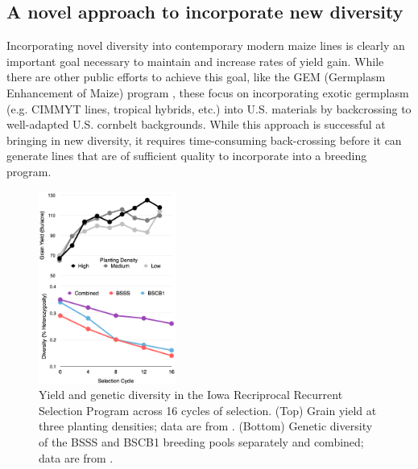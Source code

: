 \documentclass[final,12pt]{article}
\begin{document}
\subsection*{A novel approach to incorporate new diversity}

Incorporating novel diversity into contemporary modern maize lines is clearly an important goal necessary to maintain and increase rates of yield gain.
While there are other public efforts to achieve this goal, like the GEM  (Germplasm Enhancement of Maize) program \citep{pollak2003history}, these  focus on incorporating exotic germplasm (e.g. CIMMYT lines, tropical hybrids, etc.) into U.S. materials by backcrossing to well-adapted U.S. cornbelt backgrounds.
While this approach is successful at bringing in new diversity, it requires time-consuming back-crossing before it can generate lines that are of sufficient quality to incorporate into a breeding program.


% 
%
\begin{figure}
    \includegraphics[width=0.4\textwidth]{BSSS.png}
  \caption{Yield and genetic diversity in the Iowa Recriprocal Recurrent Selection Program across 16 cycles of selection. (Top) Grain yield at three planting densities; data are from \citet{rouse2003selection}. (Bottom) Genetic diversity of the BSSS and BSCB1 breeding pools separately and combined; data are from \citet{Gerke:2013tw}.}
\label{fig:trends}
\end{figure}
\end{document}
